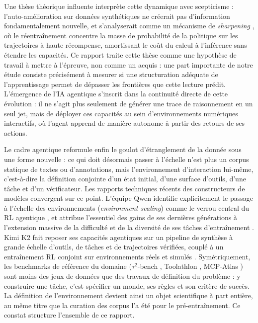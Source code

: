 \documentclass[11pt,a4paper]{article}
\begin{document}
Une thèse théorique influente interprète cette dynamique avec scepticisme : l'auto-amélioration sur données synthétiques ne créerait pas d'information fondamentalement nouvelle, et s'analyserait comme un mécanisme de \emph{sharpening} \cite{huang2024self}, où le réentraînement concentre la masse de probabilité de la politique sur les trajectoires à haute récompense, amortissant le coût du calcul à l'inférence sans étendre les capacités. Ce rapport traite cette thèse comme une hypothèse de travail à mettre à l'épreuve, non comme un acquis : une part importante de notre étude consiste précisément à mesurer si une structuration adéquate de l'apprentissage permet de dépasser les frontières que cette lecture prédit. L'émergence de l'IA agentique s'inscrit dans la continuité directe de cette évolution : il ne s'agit plus seulement de générer une trace de raisonnement en un seul jet, mais de déployer ces capacités au sein d'environnements numériques interactifs, où l'agent apprend de manière autonome à partir des retours de ses actions.

Le cadre agentique reformule enfin le goulot d'étranglement de la donnée sous une forme nouvelle : ce qui doit désormais passer à l'échelle n'est plus un corpus statique de textes ou d'annotations, mais l'environnement d'interaction lui-même, c'est-à-dire la définition conjointe d'un état initial, d'une surface d'outils, d'une tâche et d'un vérificateur. Les rapports techniques récents des constructeurs de modèles convergent sur ce point. L'équipe Qwen identifie explicitement le passage à l'échelle des environnements (\emph{environment scaling}) comme le verrou central du RL agentique \cite{qwen3coder2025}, et attribue l'essentiel des gains de ses dernières générations à l'extension massive de la difficulté et de la diversité de ses tâches d'entraînement \cite{qwen35_2026}. Kimi K2 fait reposer ses capacités agentiques sur un pipeline de synthèse à grande échelle d'outils, de tâches et de trajectoires vérifiées, couplé à un entraînement RL conjoint sur environnements réels et simulés \cite{kimik2_2025}. Symétriquement, les benchmarks de référence du domaine ($\tau^2$-bench \cite{tau2bench2025}, Toolathlon \cite{toolathlon2025}, MCP-Atlas \cite{mcpatlas2026}) sont moins des jeux de données que des travaux de définition du problème : y construire une tâche, c'est spécifier un monde, ses règles et son critère de succès. La définition de l'environnement devient ainsi un objet scientifique à part entière, au même titre que la curation des corpus l'a été pour le pré-entraînement. Ce constat structure l'ensemble de ce rapport.
\end{document}
